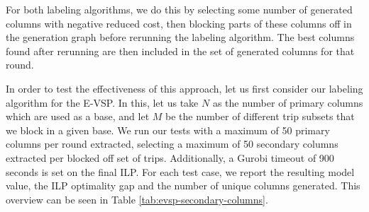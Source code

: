 \documentclass[]{article}
\begin{document}
For both labeling algorithms, we do this by selecting some number of generated columns with negative reduced cost, then blocking parts of these columns off in the generation graph before rerunning the labeling algorithm. The best columns found after rerunning are then included in the set of generated columns for that round.

In order to test the effectiveness of this approach, let us first consider our labeling algorithm for the E-VSP. In this, let us take $N$ as the number of primary columns which are used as a base, and let $M$ be the number of different trip subsets that we block in a given base. We run our tests with a maximum of 50 primary columns per round extracted, selecting a maximum of 50 secondary columns extracted per blocked off set of trips. Additionally, a Gurobi timeout of 900 seconds is set on the final ILP. For each test case, we report the resulting model value, the ILP optimality gap and the number of unique columns generated. This overview can be seen in Table \ref{tab:evsp-secondary-columns}. 
\end{document}
